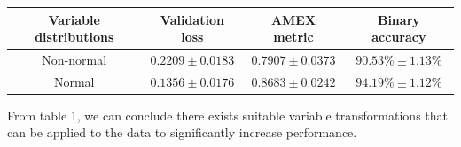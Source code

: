 \documentclass[portrait,final,x11names,a1paper,fontscale=0.4]{baposter}
\begin{document}
\begin{poster}
{\begin{center}
\begin{tabular}{c|c|c|c}
    \toprule
    Variable distributions & Validation loss & AMEX metric & Binary accuracy \\
    \midrule
    Non-normal & $0.2209 \pm 0.0183$ & $0.7907 \pm 0.0373$ & $90.53\% \pm 1.13\%$ \\
    Normal & $ 0.1356 \pm 0.0176$ & $ 0.8683 \pm 0.0242$ & $ 94.19\% \pm 1.12\%$ \\
    \bottomrule
\end{tabular}
\end{center}
From table 1, we can conclude there exists suitable variable transformations that can be applied to the data to
significantly increase performance.
}

\end{poster}
\end{document}
